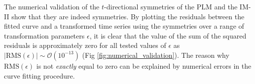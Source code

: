 The numerical validation of the $t$-directional symmetries of the PLM and the IM-II show that they are indeed symmetries. By plotting the residuals between the fitted curve and a transformed time series using the symmetries over a range of transformation parameters $\epsilon$, it is clear that the value of the sum of the squared residuals is approximately zero for all tested values of $\epsilon$ as $|\mathrm{RMS}(\epsilon)|\sim\mathcal{O}\left(10^{-13}\right)$ (Fig \ref{fig:numerical_validation}). The reason why $\mathrm{RMS}(\epsilon)$ is not \textit{exactly} equal to zero can be explained by numerical errors in the curve fitting procedure. 